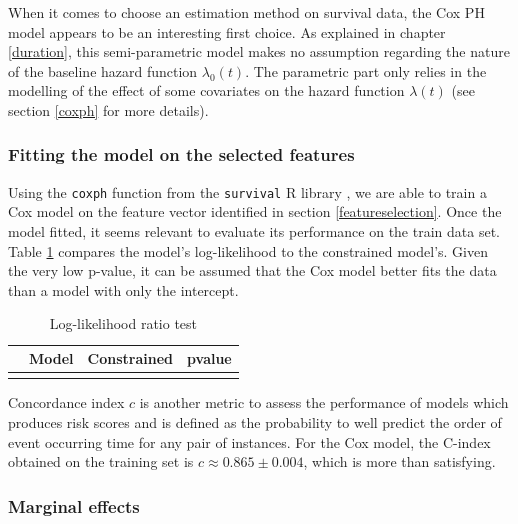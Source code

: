 \documentclass[
]{book}
\begin{document}
When it comes to choose an estimation method on survival data, the Cox PH model appears to be an interesting first choice. As explained in chapter \ref{duration}, this semi-parametric model makes no assumption regarding the nature of the baseline hazard function \(\lambda_0(t)\). The parametric part only relies in the modelling of the effect of some covariates on the hazard function \(\lambda(t)\) (see section \ref{coxph} for more details).

\hypertarget{fitting-the-model-on-the-selected-features}{%
\subsubsection*{Fitting the model on the selected features}\label{fitting-the-model-on-the-selected-features}}

Using the \texttt{coxph} function from the \texttt{survival} R library \citep{survival-book}, we are able to train a Cox model on the feature vector identified in section \ref{featureselection}. Once the model fitted, it seems relevant to evaluate its performance on the train data set. Table \ref{tab:lrtest} compares the model's log-likelihood to the constrained model's. Given the very low p-value, it can be assumed that the Cox model better fits the data than a model with only the intercept.

\begin{table}[H]

\caption{\label{tab:lrtest}Log-likelihood ratio test}
\centering
\begin{tabular}[t]{lrrr}
\toprule
  & Model & Constrained & pvalue\\
\midrule
\cellcolor{gray!6}{} & \cellcolor{gray!6}{-9228.77} & \cellcolor{gray!6}{-10448.08} & \cellcolor{gray!6}{0}\\
\bottomrule
\end{tabular}
\end{table}

Concordance index \(c\) is another metric to assess the performance of models which produces risk scores and is defined as the probability to well predict the order of event occurring time for any pair of instances. For the Cox model, the C-index obtained on the training set is \(c \approx 0.865 \pm 0.004\), which is more than satisfying.

\hypertarget{marginal-effects-1}{%
\subsubsection*{Marginal effects}\label{marginal-effects-1}}
\end{document}
